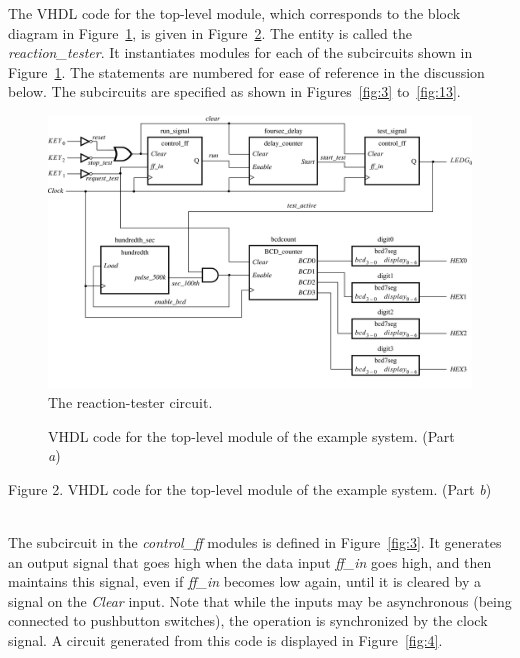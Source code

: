 \documentclass[11pt, twoside, pdftex]{article}
\begin{document}
The VHDL code for the top-level module, which corresponds to the block diagram 
in Figure~\ref{fig:1}, is given in Figure~\ref{fig:2}. The entity is called the {\it reaction\_tester}.
It instantiates modules for each of the subcircuits shown in Figure~\ref{fig:1}.
The statements are numbered for ease of reference in the discussion below.
The subcircuits are specified as shown in Figures~\ref{fig:3} to~\ref{fig:13}.

\begin{figure}[H]
   \begin{center}
      \includegraphics[scale=0.85]{figures/figure1.png}
   \caption{The reaction-tester circuit.} 
	 \label{fig:1}
	 \end{center}
\end{figure}

\begin{figure}[H]

	\caption{VHDL code for the top-level module of the example system. (Part {\it a})}
	\label{fig:2}
\end{figure}

\newpage
\begin{center}


Figure 2.  VHDL code for the top-level module of the example system. (Part {\it b})
\end{center}
~\\
The subcircuit in the {\it control\_ff} modules is defined in Figure~\ref{fig:3}.
It generates an output signal that goes high when the data input
{\it ff\_in} goes high, and then maintains this signal, even if {\it ff\_in}
becomes low again, until it is cleared by a
signal on the {\it Clear} input. Note that while the inputs may be asynchronous 
(being connected to pushbutton switches), the operation is synchronized by the 
clock signal. A circuit generated from this code is displayed in Figure~\ref{fig:4}.
\end{document}
